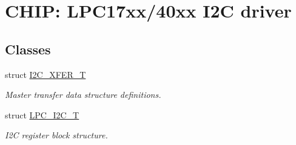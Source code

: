 \hypertarget{group__I2C__17XX__40XX}{}\section{C\+H\+IP\+: L\+P\+C17xx/40xx I2C driver}
\label{group__I2C__17XX__40XX}
\subsection*{Classes}
\begin{DoxyCompactItemize}
\item 
struct \hyperlink{structI2C__XFER__T}{I2\+C\+\_\+\+X\+F\+E\+R\+\_\+T}
\begin{DoxyCompactList}\small\item\em Master transfer data structure definitions. \end{DoxyCompactList}\item 
struct \hyperlink{structLPC__I2C__T}{L\+P\+C\+\_\+\+I2\+C\+\_\+T}
\begin{DoxyCompactList}\small\item\em I2C register block structure. \end{DoxyCompactList}\end{DoxyCompactItemize}
